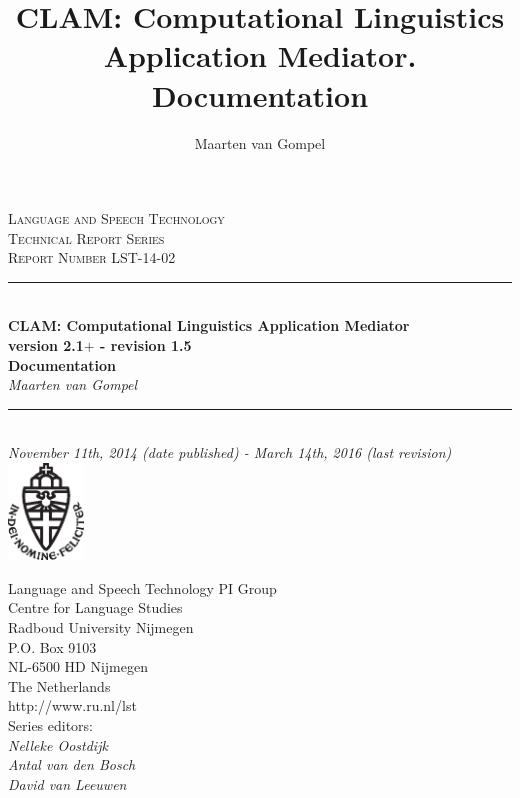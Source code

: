 \documentclass[a4paper,12pt,twoside,openright]{report}
\author{Maarten van Gompel}
\title{CLAM: Computational Linguistics Application Mediator. Documentation}
\newcommand{\HRule}{\rule{\linewidth}{0.5mm}} %
\begin{document}
\sffamily

\begin{titlepage}
\begin{center}
\textsc{\large Language and Speech Technology\\ Technical Report Series}\\[1.5cm] 
\textsc{Report Number LST-14-02}\\[0.5cm] 

\HRule \\[0.5cm]
{ \Large \bfseries CLAM: Computational Linguistics Application Mediator}\\[0.5cm] %
{\bf \small version 2.1$+$ - revision 1.5} \\[0.5cm]
{ \Large \bfseries Documentation}\\[0.5cm]
{\large \emph{Maarten van Gompel}}\\[0.5cm]
\HRule \\[1.0cm]

\emph{November 11th, 2014 (date published) - March 14th, 2016 (last revision)} \\[0.5cm] 
\includegraphics[width=20.0mm]{ru-beeldmerk-zwart.eps}
\end{center}

\begin{minipage}{0.6\textwidth}
\begin{flushleft}
Language and Speech Technology PI Group \\
Centre for Language Studies \\
Radboud University Nijmegen \\
P.O. Box 9103 \\
NL-6500 HD Nijmegen \\
The Netherlands \\
http://www.ru.nl/lst \\[0.3cm]
Series editors: \\
\hspace{0.5cm}\emph{Nelleke Oostdijk}   \\
\hspace{0.5cm}\emph{Antal van den Bosch}  \\
\hspace{0.5cm}\emph{David van Leeuwen}  \\
\end{flushleft}
\end{minipage}

\end{titlepage}
\tableofcontents
\end{document}
